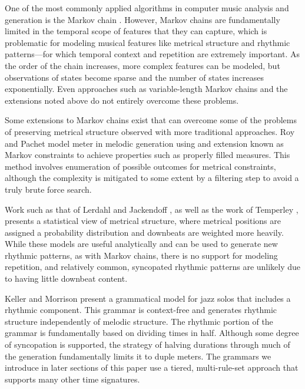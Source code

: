 \documentclass{article}
\begin{document}
One of the most commonly applied algorithms in computer music analysis and generation is the Markov chain \cite{chordia2011, gillick2009, yi, pachet}. However, Markov chains are fundamentally limited in the temporal scope of features that they can capture, which is problematic for modeling musical features like metrical structure and rhythmic patterns---for which temporal context and repetition are extremely important. As the order of the chain increases, more complex features can be modeled, but observations of states become sparse and the number of states increases exponentially. Even approaches such as variable-length Markov chains \cite{ron, buhlmann} and the extensions noted above do not entirely overcome these problems.

Some extensions to Markov chains exist that can overcome some of the problems of preserving metrical structure observed with more traditional approaches. Roy and Pachet model meter in melodic generation \cite{roy2013} using and extension known as Markov constraints \cite{pachet2011} to achieve properties such as properly filled measures. This method involves enumeration of possible outcomes for metrical constraints, although the complexity is mitigated to some extent by a filtering step to avoid a truly brute force search.

Work such as that of Lerdahl and Jackendoff \cite{gttm}, as well as the work of Temperley \cite{temperley2010}, presents a statistical view of metrical structure, where metrical positions are assigned a probability distribution and downbeats are weighted more heavily. While these models are useful analytically and can be used to generate new rhythmic patterns, as with Markov chains, there is no support for modeling repetition, and relatively common, syncopated rhythmic patterns are unlikely due to having little downbeat content. 

Keller and Morrison present a grammatical model for jazz solos that includes a rhythmic component. This grammar is context-free and generates rhythmic structure independently of melodic structure. The rhythmic portion of the grammar is fundamentally based on dividing times in half. Although some degree of syncopation is supported, the strategy of halving durations through much of the generation fundamentally limits it to duple meters. The grammars we introduce in later sections of this paper use a tiered, multi-rule-set approach that supports many other time signatures. 

\end{document}
